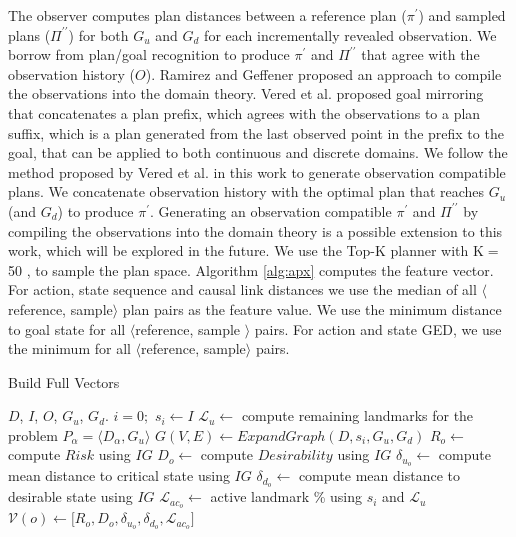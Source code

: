 \documentclass[letterpaper]{article}
\theoremstyle{plain}
\begin{document}
The observer computes plan distances between a reference plan ($\pi^\prime$) and sampled plans ($\Pi^{\prime\prime}$) for both $G_u$ and $G_d$ for each incrementally revealed observation. We borrow from plan/goal recognition to produce $\pi^\prime$ and $\Pi^{\prime\prime}$ that agree with the observation history ($O$). Ramirez and Geffener  proposed an approach to compile the observations into the domain theory. Vered et al.  proposed goal mirroring that concatenates a plan prefix, which agrees with the observations to a plan suffix, which is a plan generated from the last observed point in the prefix to the goal, that can be applied to both continuous and discrete domains. We follow the method proposed by Vered et al.  in this work to generate observation compatible plans. We concatenate observation history with the optimal plan that reaches $G_u$ (and $G_d$) to produce $\pi^\prime$. Generating an observation compatible $\pi^\prime$ and $\Pi^{\prime\prime}$ by compiling the observations into the domain theory is a possible extension to this work, which will be explored in the future. We use the Top-K planner with K$=$50 \cite{riabov2014}, to sample the plan space. Algorithm \ref{alg:apx} computes the feature vector. For action, state sequence and causal link distances we use the median of all $\langle$reference, sample$\rangle$ plan pairs as the feature value. We use the minimum distance to goal state for all $\langle$reference, sample $\rangle$ pairs. For action and state GED, we use the minimum for all $\langle$reference, sample$\rangle$ pairs.
\vspace{-2mm}
\begin{algorithm}[tb]
\tiny
        \caption{Build Full Vectors}
        \label{alg:exact}
        \begin{algorithmic}[1]
                \Require $D$, $I$, $O$, $G_u$, $G_d$.
                \State $i=0;$ $ s_i \gets I$
                \State $\mathcal{L}_{u} \gets$ compute remaining landmarks for the problem $P_\alpha=\langle D_\alpha, G_u\rangle$
                        \State $G(V,E) \gets ExpandGraph(D,s_i,G_u,G_d)$
                        \State $R_o \gets$ compute $Risk$ using $IG$
                        \State $D_o \gets$ compute $Desirability$ using $IG$
                        \State $\delta_{u_o} \gets$ compute mean distance to critical state using $IG$
                        \State $\delta_{d_o} \gets$ compute mean distance to desirable state using $IG$
                        \State $\mathcal{L}_{{ac}_o} \gets$ active landmark \% using $s_i$ and  $\mathcal{L}_{u}$
                        \State $\mathcal{V}(o) \gets \lbrack R_o,D_o,\delta_{u_o}, \delta_{d_o}, \mathcal{L}_{{ac}_o}\rbrack$
                \EndFor
                \EndProcedure
        \end{algorithmic}
\end{algorithm}
\end{document}
